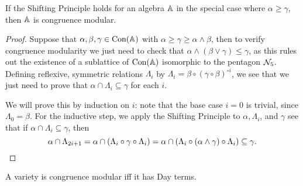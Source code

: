 \begin{appendices}
\begin{lem} If the Shifting Principle holds for an algebra $\mathbb{A}$ in the special case where $\alpha \ge \gamma$, then $\mathbb{A}$ is congruence modular.
\end{lem}
\begin{proof} Suppose that $\alpha, \beta, \gamma \in \operatorname{Con}(\mathbb{A})$ with $\alpha \ge \gamma \ge \alpha \wedge \beta$, then to verify congruence modularity we just need to check that $\alpha \wedge (\beta \vee \gamma) \le \gamma$, as this rules out the existence of a sublattice of $\operatorname{Con}(\mathbb{A})$ isomorphic to the pentagon $\mathcal{N}_5$. Defining reflexive, symmetric relations $\Lambda_i$ by $\Lambda_i = \beta\circ (\gamma\circ\beta)^{\circ i}$, we see that we just need to prove that $\alpha \cap \Lambda_i \subseteq \gamma$ for each $i$.

We will prove this by induction on $i$: note that the base case $i = 0$ is trivial, since $\Lambda_0 = \beta$. For the inductive step, we apply the Shifting Principle to $\alpha, \Lambda_i$, and $\gamma$ see that if $\alpha \cap \Lambda_i \subseteq \gamma$, then
\[
\alpha \cap \Lambda_{2i+1} = \alpha \cap (\Lambda_i \circ \gamma \circ \Lambda_i) = \alpha \cap (\Lambda_i \circ (\alpha\wedge \gamma) \circ \Lambda_i) \subseteq \gamma.\qedhere
\]
\end{proof}

\begin{cor} A variety is congruence modular iff it has Day terms.
\end{cor}

\begin{comment}
\begin{cor} A variety $\cV$ is not congruence modular if and only if there are congruences $\alpha, \beta, \gamma$ on the free algebra $\cF_\cV(x,y,z,w)$ such that
\begin{align*}
\gamma &< \alpha,\\
\alpha \circ \beta &= \beta \circ \gamma \circ \beta,\\
\alpha \wedge \beta &\le \gamma.
\end{align*}
If $\cV$ is also idempotent, then we can strengthen the above as follows: $\cV$ fails to be congruence modular iff the congruence $\theta$ of $\cF_{\cV}(x,y)^2$ generated by identifying $(y,x)$ with $(y,y)$ satisfies
\[
\theta < \ker \pi_1, \;\;\; \ker \pi_2 \circ \theta \circ \ker \pi_2 = 1.
\]
\end{cor}
\begin{proof} Let $\theta_{a,b}$ be the congruence generated by identifying $a,b$, and define $\alpha = \theta_{x,y} \vee \theta_{z,w}, \beta = \theta_{x,z} \vee \theta_{y,w}$, and $\gamma = \theta_{z,w} \vee (\alpha \wedge \beta)$. Then $\gamma < \alpha$ iff $\cV$ fails to have Day terms, and the other displayed equations involving $\alpha,\beta,\gamma$ follow directly from the definitions.


\end{comment}
\end{appendices}
